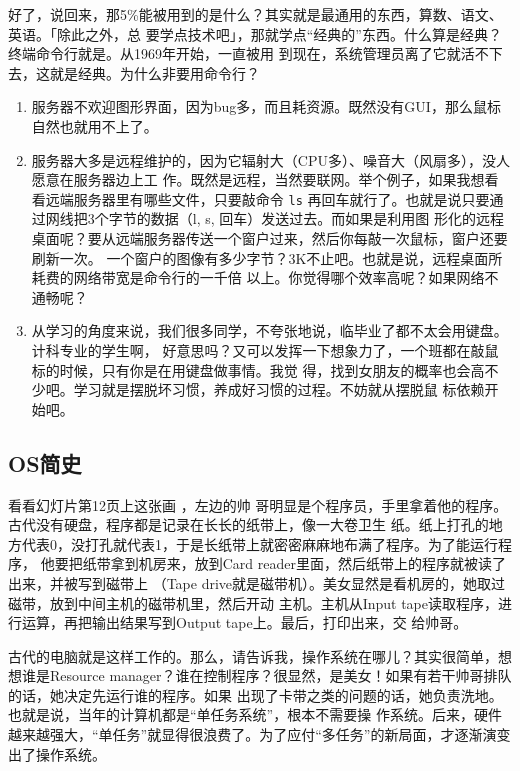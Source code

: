 \documentclass{wx672ctexart}
\newcommand\mpic[1]{%
  \marginpar{\texttt{[image: thumbnails/\#1]}}}
\begin{document}
好了，说回来，那5\%能被用到的是什么？其实就是最通用的东西，算数、语文、英语。「除此之外，总
要学点技术吧」，那就学点“经典的”东西。什么算是经典？终端命令行就是。从1969年开始，一直被用
到现在，系统管理员离了它就活不下去，这就是经典。为什么非要用命令行？
\begin{enumerate}
\item 服务器不欢迎图形界面，因为bug多，而且耗资源。既然没有GUI，那么鼠标自然也就用不上了。
\item 服务器大多是远程维护的，因为它辐射大（CPU多）、噪音大（风扇多），没人愿意在服务器边上工
作。既然是远程，当然要联网。举个例子，如果我想看看远端服务器里有哪些文件，只要敲命令 \texttt{ls}
再回车就行了。也就是说只要通过网线把3个字节的数据（l, s, 回车）发送过去。而如果是利用图
形化的远程桌面呢？要从远端服务器传送一个窗户过来，然后你每敲一次鼠标，窗户还要刷新一次。
一个窗户的图像有多少字节？3K不止吧。也就是说，远程桌面所耗费的网络带宽是命令行的一千倍
以上。你觉得哪个效率高呢？如果网络不通畅呢？
\item 从学习的角度来说，我们很多同学，不夸张地说，临毕业了都不太会用键盘。计科专业的学生啊，
好意思吗？又可以发挥一下想象力了，一个班都在敲鼠标的时候，只有你是在用键盘做事情。我觉
得，找到女朋友的概率也会高不少吧。学习就是摆脱坏习惯，养成好习惯的过程。不妨就从摆脱鼠
标依赖开始吧。
\end{enumerate}

\subsection{OS简史}
\label{sec:org0af235d}

看看幻灯片第12页上这张画\mpic{pg_0012}，左边的帅
哥明显是个程序员，手里拿着他的程序。古代没有硬盘，程序都是记录在长长的纸带上，像一大卷卫生
纸。纸上打孔的地方代表0，没打孔就代表1，于是长纸带上就密密麻麻地布满了程序。为了能运行程序，
他要把纸带拿到机房来，放到Card reader里面，然后纸带上的程序就被读了出来，并被写到磁带上
（Tape drive就是磁带机）。美女显然是看机房的，她取过磁带，放到中间主机的磁带机里，然后开动
主机。主机从Input tape读取程序，进行运算，再把输出结果写到Output tape上。最后，打印出来，交
给帅哥。

古代的电脑就是这样工作的。那么，请告诉我，操作系统在哪儿？其实很简单，想想谁是Resource
manager？谁在控制程序？很显然，是美女！如果有若干帅哥排队的话，她决定先运行谁的程序。如果
出现了卡带之类的问题的话，她负责洗地。也就是说，当年的计算机都是“单任务系统”，根本不需要操
作系统。后来，硬件越来越强大，“单任务”就显得很浪费了。为了应付“多任务”的新局面，才逐渐演变
出了操作系统。
\end{document}
